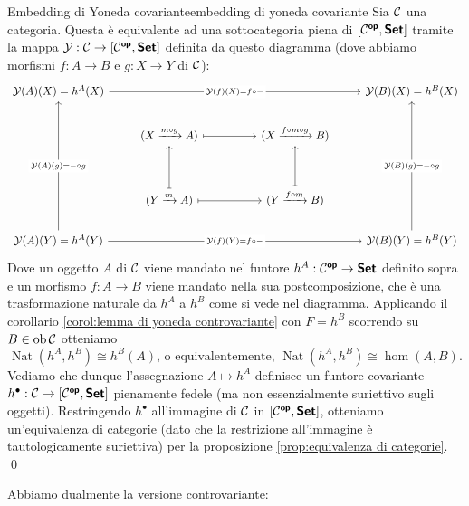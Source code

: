 \documentclass{article}
\renewcommand\C{\mc{C}}
\newcommand\nat{\operatorname{Nat}}
\begin{document}
\begin{theorem}{Embedding di Yoneda covariante}{embedding di yoneda covariante}
    Sia $\C$ una categoria. Questa è equivalente ad una sottocategoria piena di $[\C^\op, \setcat]$ tramite la mappa $\mc{Y} : \C \to [\C^\op, \setcat]$ definita da questo diagramma (dove abbiamo morfismi $f:A\to B$ e $g:X\to Y$ di $\C$):
    \[\begin{tikzcd}
    	{\mc{Y}(A)(X) = h^A(X)} &&&& {\mc{Y}(B)(X) = h^B(X)} \\
    	& {(X \xrightarrow{m\circ g} A)} && {(X \xrightarrow{f\circ m\circ g} B)} \\
    	\\
    	& {(Y \xrightarrow{m} A)} && {(Y \xrightarrow{f\circ m} B)} \\
    	{\mc{Y}(A)(Y) = h^A(Y)} &&&& {\mc{Y}(B)(Y) = h^B(Y)}
    	\arrow["{\mc{Y}(f)(X) = f\circ -}"{description}, from=1-1, to=1-5]
    	\arrow[maps to, from=2-2, to=2-4]
    	\arrow[maps to, from=4-2, to=2-2]
    	\arrow[maps to, from=4-2, to=4-4]
    	\arrow[maps to, from=4-4, to=2-4]
    	\arrow["{\mc{Y}(A)(g) = -\circ g}"{description}, from=5-1, to=1-1]
    	\arrow["{\mc{Y}(f)(Y) = f\circ -}"{description}, from=5-1, to=5-5]
	    \arrow["{\mc{Y}(B)(g) = -\circ g}"{description}, from=5-5, to=1-5]
    \end{tikzcd}\]
    Dove un oggetto $A$ di $\C$ viene mandato nel funtore $h^A : \C^\op \to \setcat$ definito sopra e un morfismo $f:A\to B$ viene mandato nella sua postcomposizione, che è una trasformazione naturale da $h^A$ a $h^B$ come si vede nel diagramma.
    \proof
    Applicando il corollario \ref{corol:lemma di yoneda controvariante} con $F = h^B$ scorrendo su $B \in \ob\C$ otteniamo
    \[\nat(h^A, h^B) \cong h^B(A) \text{, o equivalentemente, } \nat(h^A, h^B)\cong \hom(A,B).\]
    Vediamo che dunque l'assegnazione $A\mapsto h^A$ definisce un funtore covariante $h^\bullet : \C\to [\C^\op,\setcat]$ pienamente fedele (ma non essenzialmente suriettivo sugli oggetti). Restringendo $h^\bullet$ all'immagine di $\C$ in $[\C^\op,\setcat]$, otteniamo un'equivalenza di categorie (dato che la restrizione all'immagine è tautologicamente suriettiva) per la proposizione \ref{prop:equivalenza di categorie}.
    \qed
\end{theorem}

Abbiamo dualmente la versione controvariante:
\end{document}
